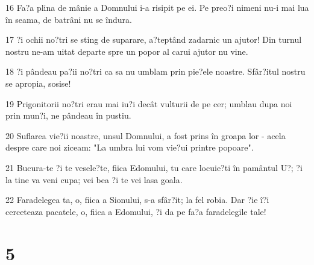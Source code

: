\par 16 Fa?a plina de mânie a Domnului i-a risipit pe ei. Pe preo?i nimeni nu-i mai lua în seama, de batrâni nu se îndura.
\par 17 ?i ochii no?tri se sting de suparare, a?teptând zadarnic un ajutor! Din turnul nostru ne-am uitat departe spre un popor al carui ajutor nu vine.
\par 18 ?i pândeau pa?ii no?tri ca sa nu umblam prin pie?ele noastre. Sfâr?itul nostru se apropia, sosise!
\par 19 Prigonitorii no?tri erau mai iu?i decât vulturii de pe cer; umblau dupa noi prin mun?i, ne pândeau în pustiu.
\par 20 Suflarea vie?ii noastre, unsul Domnului, a fost prins în groapa lor - acela despre care noi ziceam: "La umbra lui vom vie?ui printre popoare".
\par 21 Bucura-te ?i te vesele?te, fiica Edomului, tu care locuie?ti în pamântul U?; ?i la tine va veni cupa; vei bea ?i te vei lasa goala.
\par 22 Faradelegea ta, o, fiica a Sionului, s-a sfâr?it; la fel robia. Dar ?ie î?i cerceteaza pacatele, o, fiica a Edomului, ?i da pe fa?a faradelegile tale!

\chapter{5}

